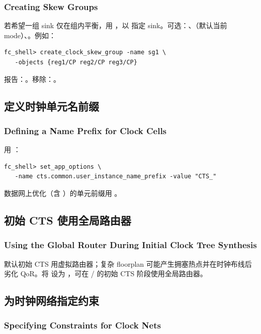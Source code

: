 \subsubsection*{Creating Skew Groups}

若希望一组 sink 仅在组内平衡，用 ，以  指定 sink。可选：、（默认当前 mode）、。例如：
\begin{lstlisting}
fc_shell> create_clock_skew_group -name sg1 \
   -objects {reg1/CP reg2/CP reg3/CP}
\end{lstlisting}
报告：。移除：。

\subsection{定义时钟单元名前缀}
\subsubsection*{Defining a Name Prefix for Clock Cells}

用 ：
\begin{lstlisting}
fc_shell> set_app_options \
   -name cts.common.user_instance_name_prefix -value "CTS_"
\end{lstlisting}
数据网上优化（含 \cmd{clock\_opt}）的单元前缀用 。

\subsection{初始 CTS 使用全局路由器}
\subsubsection*{Using the Global Router During Initial Clock Tree Synthesis}

默认初始 CTS 用虚拟路由器；复杂 floorplan 可能产生拥塞热点并在时钟布线后劣化 QoR。将  设为 ，可在 / 的初始 CTS 阶段使用全局路由器。

\subsection{为时钟网络指定约束}
\subsubsection*{Specifying Constraints for Clock Nets}

